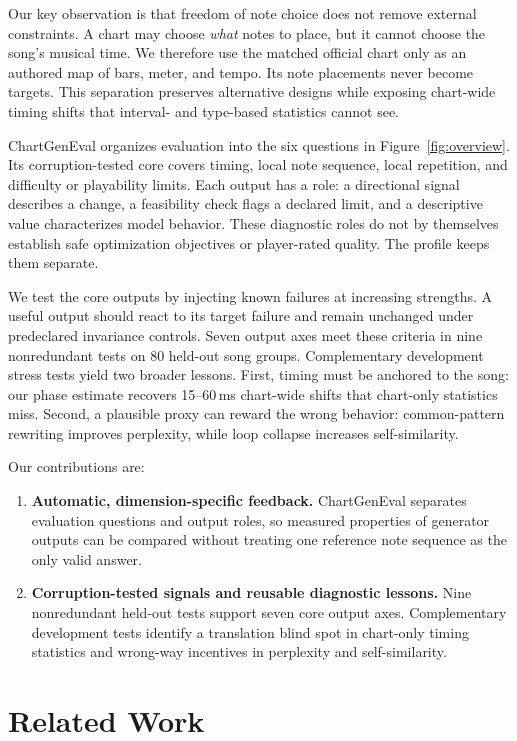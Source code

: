\documentclass[10pt,twocolumn]{article}
\newcommand{\figref}[1]{Figure~\ref{#1}}
\begin{document}
Our key observation is that freedom of note choice does not remove external
constraints. A chart may choose \emph{what} notes to place, but it cannot
choose the song's musical time. We therefore use the matched official chart
only as an authored map of bars, meter, and tempo. Its note placements never
become targets. This separation preserves alternative designs while exposing
chart-wide timing shifts that interval- and type-based statistics cannot see.

ChartGenEval organizes evaluation into the six questions in
\figref{fig:overview}. Its corruption-tested core covers timing, local note
sequence, local repetition, and difficulty or playability limits. Each output
has a role: a directional signal describes a change, a feasibility check flags
a declared limit, and a descriptive value characterizes model behavior.
These diagnostic roles do not by themselves establish safe optimization
objectives or player-rated quality. The profile keeps them separate.

We test the core outputs by injecting known failures at increasing strengths.
A useful output should react to its target failure and remain unchanged under
predeclared invariance controls. Seven output axes meet these criteria in nine
nonredundant tests on 80 held-out song groups. Complementary development
stress tests yield two broader lessons. First, timing must be anchored to the
song: our phase estimate recovers 15--60\,ms chart-wide shifts that chart-only
statistics miss. Second, a plausible proxy can reward the wrong behavior:
common-pattern rewriting improves perplexity, while loop collapse increases
self-similarity.

Our contributions are:
\begin{enumerate}
\item \textbf{Automatic, dimension-specific feedback.} ChartGenEval
  separates evaluation questions and output roles, so measured properties of
  generator outputs can be compared without treating one reference note
  sequence as the only valid answer.
\item \textbf{Corruption-tested signals and reusable diagnostic lessons.}
  Nine nonredundant held-out tests support seven core output axes.
  Complementary development tests identify a translation blind spot in
  chart-only timing statistics and wrong-way incentives in perplexity and
  self-similarity.
\end{enumerate}

\section{Related Work}\label{sec:related}
\end{document}
